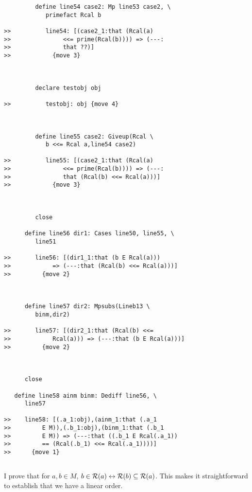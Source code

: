 \documentclass[12pt]{article}
\begin{document}
\begin{verbatim}
         define line54 case2: Mp line53 case2, \
            primefact Rcal b

>>          line54: [(case2_1:that (Rcal(a)
>>               <<= prime(Rcal(b)))) => (---:
>>               that ??)]
>>            {move 3}



         declare testobj obj

>>          testobj: obj {move 4}



         define line55 case2: Giveup(Rcal \
            b <<= Rcal a,line54 case2)

>>          line55: [(case2_1:that (Rcal(a)
>>               <<= prime(Rcal(b)))) => (---:
>>               that (Rcal(b) <<= Rcal(a)))]
>>            {move 3}



         close

      define line56 dir1: Cases line50, line55, \
         line51

>>       line56: [(dir1_1:that (b E Rcal(a)))
>>            => (---:that (Rcal(b) <<= Rcal(a)))]
>>         {move 2}



      define line57 dir2: Mpsubs(Lineb13 \
         binm,dir2)

>>       line57: [(dir2_1:that (Rcal(b) <<=
>>            Rcal(a))) => (---:that (b E Rcal(a)))]
>>         {move 2}



      close

   define line58 ainm binm: Dediff line56, \
      line57

>>    line58: [(.a_1:obj),(ainm_1:that (.a_1
>>         E M)),(.b_1:obj),(binm_1:that (.b_1
>>         E M)) => (---:that ((.b_1 E Rcal(.a_1))
>>         == (Rcal(.b_1) <<= Rcal(.a_1))))]
>>      {move 1}


\end{verbatim}

I prove that for $a,b \in M$, $b \in {\cal R}(a) \leftrightarrow {\cal R}(b) \subseteq {\cal R}(a)$.  This makes it straightforward to establish that we have a linear order.
\end{document}
